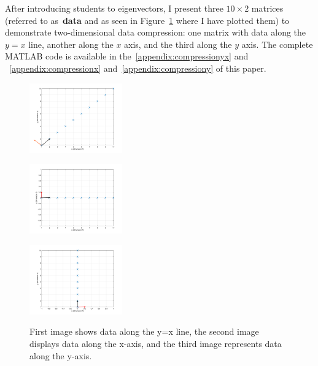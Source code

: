 \documentclass{article}
\begin{document}
After introducing students to eigenvectors, I present three $10 \times 2$ matrices (referred to as~\textbf{data} and as seen in Figure~\ref{fig:three_images} where I have plotted them) to demonstrate two-dimensional data compression: one matrix with data along the $y=x$ line, another along the $x$ axis, and the third along the $y$ axis. 
The complete MATLAB code is available in the~\ref{appendix:compressionyx} and ~\ref{appendix:compressionx} and~\ref{appendix:compressiony} of this paper.
\begin{figure}[ht]
    \centering
    \begin{minipage}{0.32\textwidth}
        \centering
        \includegraphics[height=3cm]{pictures/u1.png} %
        \label{fig:image1}
    \end{minipage}\hfill
    \begin{minipage}{0.32\textwidth}
        \centering
        \includegraphics[height=3cm]{pictures/u2.png} %
        \label{fig:image2}
    \end{minipage}\hfill
    \begin{minipage}{0.32\textwidth}
        \centering
        \includegraphics[height=3cm]{pictures/u3.png} %
        \label{fig:image3}
    \end{minipage}
    \caption{First image shows data along the y=x line, the second image displays data along the x-axis, and the third image represents data along the y-axis.}
    \label{fig:three_images}
\end{figure}
\end{document}
